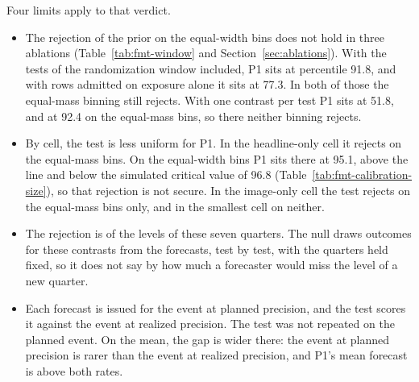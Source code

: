 Four limits apply to that verdict.
\begin{itemize}
\item The rejection of the prior on the equal-width bins does not hold in three ablations (Table~\ref{tab:fmt-window} and Section~\ref{sec:ablations}). With the tests of the randomization window included, P1 sits at percentile 91.8, and with rows admitted on exposure alone it sits at 77.3. In both of those the equal-mass binning still rejects. With one contrast per test P1 sits at 51.8, and at 92.4 on the equal-mass bins, so there neither binning rejects.
\item By cell, the test is less uniform for P1. In the headline-only cell it rejects on the equal-mass bins. On the equal-width bins P1 sits there at 95.1, above the line and below the simulated critical value of 96.8 (Table~\ref{tab:fmt-calibration-size}), so that rejection is not secure. In the image-only cell the test rejects on the equal-mass bins only, and in the smallest cell on neither.
\item The rejection is of the levels of these seven quarters. The null draws outcomes for these contrasts from the forecasts, test by test, with the quarters held fixed, so it does not say by how much a forecaster would miss the level of a new quarter.
\item Each forecast is issued for the event at planned precision, and the test scores it against the event at realized precision. The test was not repeated on the planned event. On the mean, the gap is wider there: the event at planned precision is rarer than the event at realized precision, and P1's mean forecast is above both rates.
\end{itemize}
